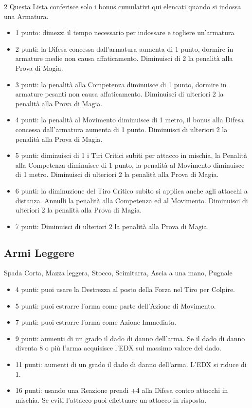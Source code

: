 \begin{multicols}{2}
Questa Lista conferisce solo i bonus cumulativi qui elencati quando si indossa una Armatura.

\begin{itemize}[leftmargin=*] \setlength{\itemsep}{0pt}

\item 1 punto: dimezzi il tempo necessario per indossare e togliere un'armatura
\item 2 punti: la Difesa concessa dall'armatura aumenta di 1 punto, dormire in armature medie non causa affaticamento. Diminuisci di 2 la penalità alla Prova di Magia.
\item 3 punti: la penalità alla Competenza diminuisce di 1 punto, dormire in armature pesanti non causa affaticamento. Diminuisci di ulteriori 2 la penalità alla Prova di Magia.
\item 4 punti: la penalità al Movimento diminuisce di 1 metro, il bonus alla Difesa concessa dall'armatura aumenta di 1 punto. Diminuisci di ulteriori 2 la penalità alla Prova di Magia.
\item 5 punti: diminuisci di 1 i Tiri Critici subiti per attacco in mischia, la Penalità alla Competenza diminuisce di 1 punto, la penalità al Movimento diminuisce di 1 metro. Diminuisci di ulteriori 2 la penalità alla Prova di Magia.
\item 6 punti: la diminuzione del Tiro Critico subito si applica anche agli attacchi a distanza. Annulli la penalità alla Competenza ed al Movimento. Diminuisci di ulteriori 2 la penalità alla Prova di Magia.
\item 7 punti: Diminuisci di ulteriori 2 la penalità alla Prova di Magia.
\end{itemize}

\subsection{Armi Leggere} Spada Corta, Mazza leggera, Stocco, Scimitarra, Ascia a una mano, Pugnale\label{listaarmileggere}

\begin{itemize}[leftmargin=*] \setlength{\itemsep}{0pt}

\item 4 punti: puoi usare la Destrezza al posto della Forza nel Tiro per Colpire.
\item 5 punti: puoi estrarre l'arma come parte dell'Azione di Movimento.
\item 7 punti: puoi estrarre l'arma come Azione Immediata.
\item 9 punti: aumenti di un grado il dado di danno dell'arma. Se il dado di danno diventa 8 o più l'arma acquisisce l'EDX sul massimo valore del dado.
\item 11 punti: aumenti di un grado il dado di danno dell'arma. L'EDX si riduce di 1.
\item 16 punti: usando una Reazione prendi +4 alla Difesa contro attacchi in mischia. Se eviti l'attacco puoi effettuare un attacco in risposta.


\end{itemize}
\end{multicols}
